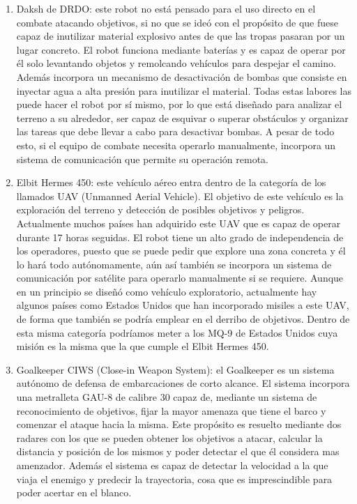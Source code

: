 \begin{enumerate}
  \item Daksh de DRDO: este robot no está pensado para el uso directo en el combate atacando objetivos, si no que se ideó con el propósito de que fuese capaz de inutilizar material explosivo antes de que las tropas pasaran por un lugar concreto. El robot funciona mediante baterías y es capaz de operar por él solo levantando objetos y remolcando vehículos para despejar el camino. Además incorpora un mecanismo de desactivación de bombas que consiste en inyectar agua a alta presión para inutilizar el material. Todas estas labores las puede hacer el robot por sí mismo, por lo que está diseñado para analizar el terreno a su alrededor, ser capaz de esquivar o superar obstáculos y organizar las tareas que debe llevar a cabo para desactivar bombas. A pesar de todo esto, si el equipo de combate necesita operarlo manualmente, incorpora un sistema de comunicación que permite su operación remota.
  \item Elbit Hermes 450: este vehículo aéreo entra dentro de la categoría de los llamados UAV (Unmanned Aerial Vehicle). El objetivo de este vehículo es la exploración del terreno y detección de posibles objetivos y peligros. Actualmente muchos países han adquirido este UAV que es capaz de operar durante 17 horas seguidas. El robot tiene un alto grado de independencia de los operadores, puesto que se puede pedir que explore una zona concreta y él lo hará todo autónomamente, aún así también se incorpora un sistema de comunicación por satélite para operarlo manualmente si se requiere. Aunque en un principio se diseñó como vehículo exploratorio, actualmente hay algunos países como Estados Unidos que han incorporado misiles a este UAV, de forma que también se podría emplear en el derribo de objetivos. Dentro de esta misma categoría podríamos meter a los MQ-9 de Estados Unidos cuya misión es la misma que la que cumple el Elbit Hermes 450.
  \item Goalkeeper CIWS (Close-in Weapon System): el Goalkeeper es un sistema autónomo de defensa de embarcaciones de corto alcance. El sistema incorpora una metralleta GAU-8 de calibre 30 capaz de, mediante un sistema de reconocimiento de objetivos, fijar la mayor amenaza que tiene el barco y comenzar el ataque hacia la misma. Este propósito es resuelto mediante dos radares con los que se pueden obtener los objetivos a atacar, calcular la distancia y posición de los mismos y poder detectar el que él considera mas amenzador. Además el sistema es capaz de detectar la velocidad a la que viaja el enemigo y predecir la trayectoria, cosa que es imprescindible para poder acertar en el blanco.

\end{enumerate}
